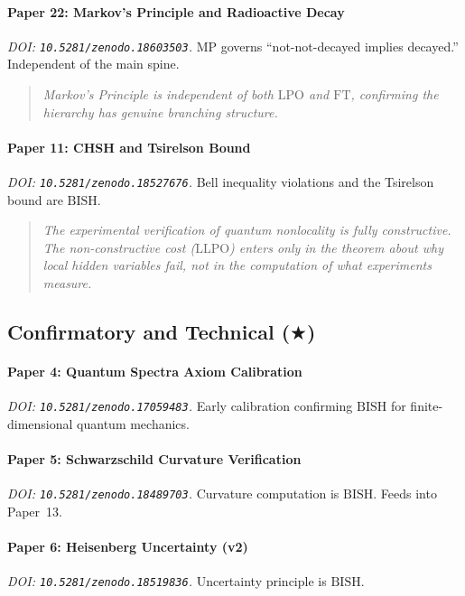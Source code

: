 \documentclass[11pt,a4paper]{report}
\theoremstyle{plain}
\theoremstyle{definition}
\theoremstyle{remark}
\newcommand{\BISH}{\mathrm{BISH}}
\newcommand{\LLPO}{\mathrm{LLPO}}
\newcommand{\LPO}{\mathrm{LPO}}
\newcommand{\FT}{\mathrm{FT}}
\newcommand{\MP}{\mathrm{MP}}
\newcommand{\OneStar}{$\bigstar$}
\begin{document}
\paragraph{Paper 22: Markov's Principle and Radioactive Decay}
\emph{DOI: \texttt{10.5281/zenodo.18603503}.}\quad
$\MP$ governs ``not-not-decayed implies decayed.''  Independent of the main spine.
\begin{quote}\itshape
Markov's Principle is independent of both $\LPO$ and $\FT$, confirming the hierarchy has genuine branching structure.
\end{quote}

\paragraph{Paper 11: CHSH and Tsirelson Bound}
\emph{DOI: \texttt{10.5281/zenodo.18527676}.}\quad
Bell inequality violations and the Tsirelson bound are $\BISH$.
\begin{quote}\itshape
The experimental verification of quantum nonlocality is fully constructive.  The non-constructive cost ($\LLPO$) enters only in the theorem about why local hidden variables fail, not in the computation of what experiments measure.
\end{quote}

\subsection{Confirmatory and Technical {\normalfont(\OneStar)}}

\paragraph{Paper 4: Quantum Spectra Axiom Calibration}
\emph{DOI: \texttt{10.5281/zenodo.17059483}.}\quad
Early calibration confirming $\BISH$ for finite-dimensional quantum mechanics.

\paragraph{Paper 5: Schwarzschild Curvature Verification}
\emph{DOI: \texttt{10.5281/zenodo.18489703}.}\quad
Curvature computation is $\BISH$.  Feeds into Paper~13.

\paragraph{Paper 6: Heisenberg Uncertainty (v2)}
\emph{DOI: \texttt{10.5281/zenodo.18519836}.}\quad
Uncertainty principle is $\BISH$.
\end{document}

